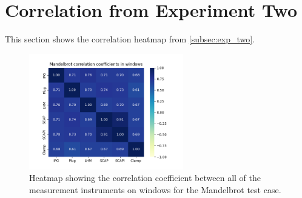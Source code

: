 \section*{Correlation from Experiment Two}\label{app:cor_exp_two}

This section shows the correlation heatmap from \cref{subsec:exp_two}.

\begin{figure}[H]
    \centering
    \hspace*{-1cm} %
    \includegraphics[width=0.6\textwidth]{figures/Mandelbrot_ex2.png}
    \caption{Heatmap showing the correlation coefficient between all of the measurement instruments on windows for the Mandelbrot test case.}
    \label{fig:mandelbrotCorr}
\end{figure}